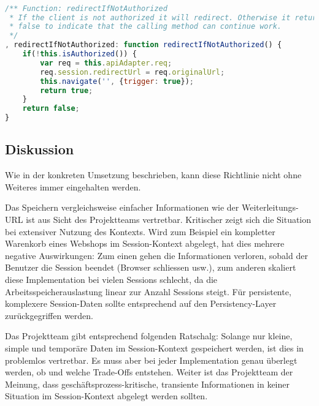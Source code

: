 \begin{lstlisting}[language=JavaScript, caption=Router - Autorisationskontrolle \cite{roomiesRouter}, label=lst:router-set-redirecturl, firstnumber=225]

/** Function: redirectIfNotAuthorized
 * If the client is not authorized it will redirect. Otherwise it returns
 * false to indicate that the calling method can continue work.
 */
, redirectIfNotAuthorized: function redirectIfNotAuthorized() {
	if(!this.isAuthorized()) {
		var req = this.apiAdapter.req;
		req.session.redirectUrl = req.originalUrl;
		this.navigate('', {trigger: true});
		return true;
	}
	return false;
}
\end{lstlisting}


\subsection*{Diskussion}
Wie in der konkreten Umsetzung beschrieben, kann diese Richtlinie nicht ohne Weiteres immer eingehalten werden.

Das Speichern vergleichsweise einfacher Informationen wie der Weiterleitungs-\gls{URL} ist aus Sicht des Projektteams vertretbar. Kritischer zeigt sich die Situation bei extensiver Nutzung des Kontexts. Wird zum Beispiel ein kompletter Warenkorb eines Webshops im Session-Kontext abgelegt, hat dies mehrere negative Auswirkungen: Zum einen gehen die Informationen verloren, sobald der Benutzer die Session beendet (Browser schliessen usw.), zum anderen skaliert diese Implementation bei vielen Sessions schlecht, da die Arbeitsspeicherauslastung linear zur Anzahl Sessions steigt. Für persistente, komplexere Session-Daten sollte entsprechend auf den Persistency-Layer zurückgegriffen werden.

Das Projektteam gibt entsprechend folgenden Ratschalg: Solange nur kleine, simple und temporäre Daten im Session-Kontext gespeichert werden, ist dies in problemlos vertretbar. Es muss aber bei jeder Implementation genau überlegt werden, ob und welche Trade-Offs entstehen.
Weiter ist das Projektteam der Meinung, dass geschäftsprozess-kritische, transiente Informationen in keiner Situation im Session-Kontext abgelegt werden sollten.